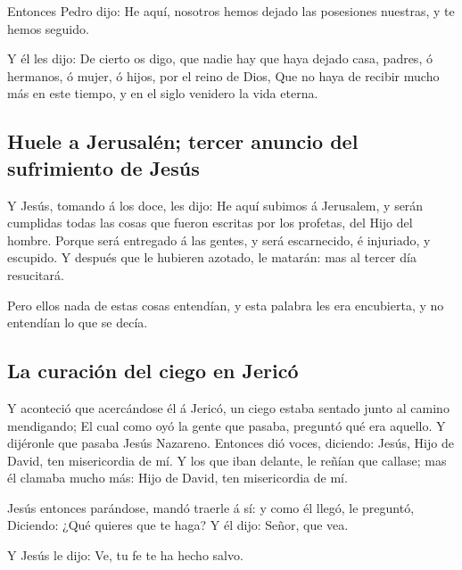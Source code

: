  Entonces Pedro dijo: He aquí, nosotros hemos dejado las
posesiones nuestras, y te hemos seguido.

 Y él les dijo: De cierto os digo, que nadie hay que haya
dejado casa, padres, ó hermanos, ó mujer, ó hijos, por el reino de Dios,
 Que no haya de recibir mucho más en este tiempo, y en el
siglo venidero la vida eterna.

\hypertarget{huele-a-jerusaluxe9n-tercer-anuncio-del-sufrimiento-de-jesuxfas}{%
\subsection{Huele a Jerusalén; tercer anuncio del sufrimiento de
Jesús}\label{huele-a-jerusaluxe9n-tercer-anuncio-del-sufrimiento-de-jesuxfas}}

 Y Jesús, tomando á los doce, les dijo: He aquí subimos á
Jerusalem, y serán cumplidas todas las cosas que fueron escritas por los
profetas, del Hijo del hombre.  Porque será entregado á
las gentes, y será escarnecido, é injuriado, y escupido. 
Y después que le hubieren azotado, le matarán: mas al tercer día
resucitará.

 Pero ellos nada de estas cosas entendían, y esta palabra
les era encubierta, y no entendían lo que se decía.

\hypertarget{la-curaciuxf3n-del-ciego-en-jericuxf3}{%
\subsection{La curación del ciego en
Jericó}\label{la-curaciuxf3n-del-ciego-en-jericuxf3}}

 Y aconteció que acercándose él á Jericó, un ciego estaba
sentado junto al camino mendigando;  El cual como oyó la
gente que pasaba, preguntó qué era aquello.  Y dijéronle
que pasaba Jesús Nazareno.  Entonces dió voces, diciendo:
Jesús, Hijo de David, ten misericordia de mí.  Y los que
iban delante, le reñían que callase; mas él clamaba mucho más: Hijo de
David, ten misericordia de mí.

 Jesús entonces parándose, mandó traerle á sí: y como él
llegó, le preguntó,  Diciendo: ¿Qué quieres que te haga?
Y él dijo: Señor, que vea.

 Y Jesús le dijo: Ve, tu fe te ha hecho salvo.

